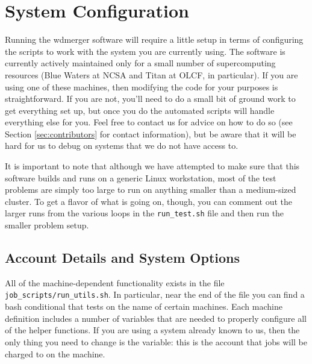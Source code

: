 \documentclass[12pt]{book}
\begin{document}
\chapter{System Configuration}

Running the wdmerger software will require a little setup in terms of configuring the 
scripts to work with the system you are currently using. The software is currently actively 
maintained only for a small number of supercomputing resources (Blue Waters at NCSA 
and Titan at OLCF, in particular). If you are using one of these machines, then 
modifying the code for your purposes is straightforward. If you are not, you'll need to do a 
small bit of ground work to get everything set up, but once you do the automated scripts 
will handle everything else for you. Feel free to contact us for advice on how to do so 
(see Section \ref{sec:contributors} for contact information), but be aware that it will be 
hard for us to debug on systems that we do not have access to. 

It is important to note that although we have attempted to 
make sure that this software builds and runs on a generic Linux workstation, most of the test 
problems are simply too large to run on anything smaller than a medium-sized cluster. To get a flavor 
of what is going on, though, you can comment out the larger runs from the various loops in the 
\texttt{run\_test.sh} file and then run the smaller problem setup.

\section{Account Details and System Options}

All of the machine-dependent functionality exists in the file \texttt{job\_scripts/run\_utils.sh}.
In particular, near the end of the file you can find a bash conditional that tests on the name of 
certain machines. Each machine definition includes a number of variables that are needed to 
properly configure all of the helper functions. If you are using a system already known to us,
then the only thing you need to change is the  variable: this is the account 
that jobs will be charged to on the machine. 
\end{document}
